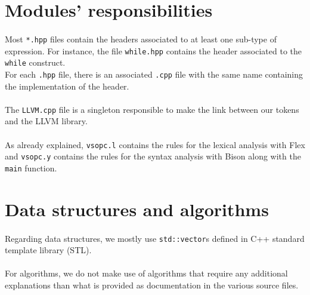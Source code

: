 \documentclass[a4paper, 11pt, oneside]{article}
\begin{document}

\section{Modules' responsibilities}
\paragraph{}Most \texttt{*.hpp} files contain the headers associated to at least one sub-type of expression. For instance, the file \texttt{while.hpp} contains the header associated to the \texttt{while} construct.\\
For each \texttt{.hpp} file, there is an associated \texttt{.cpp} file with the same name containing the implementation of the header.

\paragraph{}The \texttt{LLVM.cpp} file is a singleton responsible to make the link between our tokens and the LLVM library. 

\paragraph{}As already explained, \texttt{vsopc.l} contains the rules for the lexical analysis with Flex and \texttt{vsopc.y} contains the rules for the syntax analysis with Bison along with the \texttt{main} function.


\section{Data structures and algorithms}
\paragraph{}Regarding data structures, we mostly use \texttt{std::vector}s defined in C++ standard template library (STL).

\paragraph{}For algorithms, we do not make use of algorithms that require any additional explanations than what is provided as documentation in the various source files.

\end{document}
